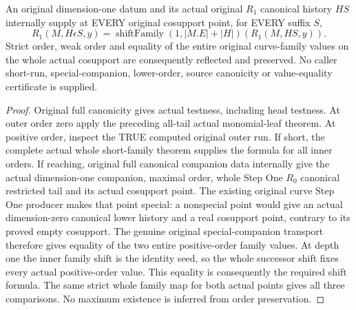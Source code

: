 \begin{theorem}
\label{hir:original-curve-entire-interior-value-order}
\leanok
An original dimension-one datum and its actual original $R_1$ canonical
history $HS$ internally supply at EVERY original cosupport point, for EVERY
suffix $S$,
\[
 R_1(M,H\epsilon S,y)=\operatorname{shiftFamily}(1,|M.E|+|H|)(R_1(M,HS,y)).
\]
Strict order, weak order and equality of the entire original curve-family
values on the whole actual cosupport are consequently reflected and preserved.
No caller short-run, special-companion, lower-order, source canonicity or
value-equality certificate is supplied.
\end{theorem}
\begin{proof}
Original full canonicity gives actual testness, including head testness. At
outer order zero apply the preceding all-tail actual monomial-leaf theorem.
At positive order, inspect the TRUE computed original outer run. If short,
the complete actual whole short-family theorem supplies the formula for all
inner orders. If reaching, original full canonical companion data internally
give the actual dimension-one companion, maximal order, whole Step One $R_0$
canonical restricted tail and its actual cosupport point. The existing
original curve Step One producer makes that point special: a nonspecial point
would give an actual dimension-zero canonical lower history and a real
cosupport point, contrary to its proved empty cosupport. The genuine original
special-companion transport therefore gives equality of the two entire
positive-order family values. At depth one the inner family shift is the
identity seed, so the whole successor shift fixes every actual positive-order
value. This equality is consequently the required shift formula. The same
strict whole family map for both actual points gives all three comparisons.
No maximum existence is inferred from order preservation.
\end{proof}

